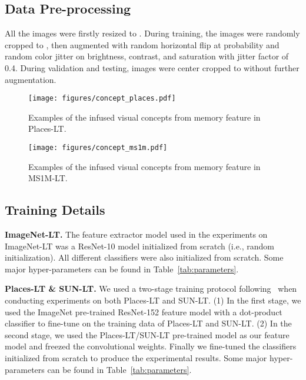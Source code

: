 \documentclass[10pt,twocolumn,letterpaper]{article}
\begin{document}
\subsection{Data Pre-processing}

All the images were firstly resized to . During training, the images were randomly cropped to , then augmented with random horizontal flip at probability  and random color jitter on brightness, contrast, and saturation with jitter factor of 0.4. During validation and testing, images were center cropped to  without further augmentation.



\begin{figure*}
  \centering
  \texttt{[image: figures/concept\_places.pdf]}
  \vspace{-16pt}
  \caption{Examples of the infused visual concepts from memory feature in Places-LT.}
  \label{fig:concept_places}
\end{figure*}



\begin{figure*}
  \centering
  \texttt{[image: figures/concept\_ms1m.pdf]}
  \vspace{-16pt}
  \caption{Examples of the infused visual concepts from memory feature in MS1M-LT.}
  \label{fig:concept_ms1m}
\end{figure*}



\subsection{Training Details}



\vspace{2pt}
\noindent
\textbf{ImageNet-LT.}
The feature extractor model used in the experiments on ImageNet-LT was a ResNet-10 model initialized from scratch (i.e., random initialization). All different classifiers were also initialized from scratch. Some major hyper-parameters can be found in Table~\ref{tab:parameters}.

\vspace{2pt}
\noindent
\textbf{Places-LT \& SUN-LT.}
We used a two-stage training protocol following~\cite{gidaris2018dynamic} when conducting experiments on both Places-LT and SUN-LT. (1) In the first stage, we used the ImageNet pre-trained ResNet-152 feature model with a dot-product classifier to fine-tune on the training data of Places-LT and SUN-LT. (2) In the second stage, we used the Places-LT/SUN-LT pre-trained model as our feature model and freezed the convolutional weights. Finally we fine-tuned the classifiers initialized from scratch to produce the experimental results. Some major hyper-parameters can be found in Table~\ref{tab:parameters}.
\end{document}
